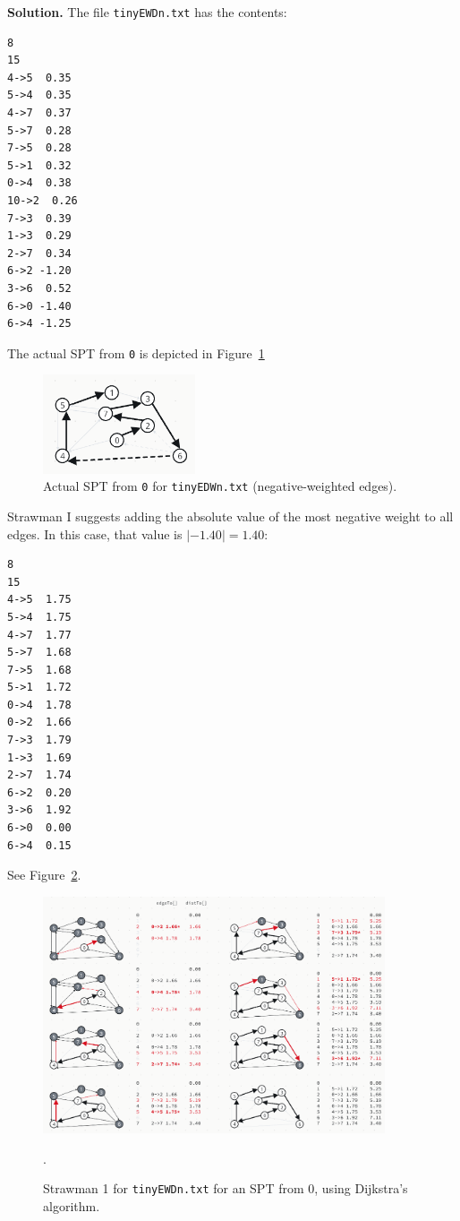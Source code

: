 \documentclass[12pt, a4paper]{article}
\newenvironment{sol}[1][Solution]
{\par\medskip\noindent \textbf{#1.} }
{\medskip}
\begin{document}
	\begin{sol}
		The file \texttt{tinyEWDn.txt} has the contents:
		\begin{lstlisting}[language={}]
8
15
4->5  0.35
5->4  0.35
4->7  0.37
5->7  0.28
7->5  0.28
5->1  0.32
0->4  0.38
10->2  0.26
7->3  0.39
1->3  0.29
2->7  0.34
6->2 -1.20
3->6  0.52
6->0 -1.40
6->4 -1.25
		\end{lstlisting}
		The actual SPT from \texttt{0} is depicted in Figure~\ref{fig:ex-14-actual}
		\begin{figure}
			\centering
			\includegraphics[width=0.4\textwidth]{exercise-14-actual-result}
			\caption{Actual SPT from \texttt{0} for \texttt{tinyEDWn.txt} (negative-weighted edges).}
			\label{fig:ex-14-actual}
		\end{figure}
		Strawman I suggests adding the absolute value of the most negative weight to
		all edges. In this case, that value is $|-1.40|=1.40$:
		\begin{lstlisting}[language={}]
8
15
4->5  1.75
5->4  1.75
4->7  1.77
5->7  1.68
7->5  1.68
5->1  1.72
0->4  1.78
0->2  1.66
7->3  1.79
1->3  1.69
2->7  1.74
6->2  0.20
3->6  1.92
6->0  0.00
6->4  0.15
		\end{lstlisting}
		See Figure~\ref{fig:ex-14-s1}.
		\begin{figure}
			\centering
			\includegraphics[width=0.9\textwidth]{exercise-14-strawman-1-trace}
			\caption{Strawman 1 for \texttt{tinyEWDn.txt} for an SPT from 0, using Dijkstra's algorithm.}
			\label{fig:ex-14-s1}.
		\end{figure}
	\end{sol}
\end{document}
